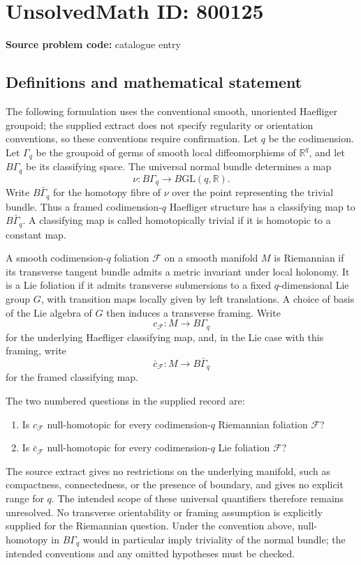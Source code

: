 \documentclass[11pt]{article}
\newcommand{\R}{\mathbb{R}}
\begin{document}
\section*{UnsolvedMath ID: 800125}
\textbf{Source problem code:} catalogue entry
\subsection{Definitions and mathematical statement}
The following formulation uses the conventional smooth, unoriented Haefliger groupoid; the supplied extract does not specify regularity or orientation conventions, so these conventions require confirmation. Let \(q\) be the codimension. Let \(\Gamma_q\) be the groupoid of germs of smooth local diffeomorphisms of \(\R^q\), and let \(B\Gamma_q\) be its classifying space. The universal normal bundle determines a map
\[
\nu\colon B\Gamma_q\longrightarrow B\mathrm{GL}(q,\R).
\]
Write \(B\bar\Gamma_q\) for the homotopy fibre of \(\nu\) over the point representing the trivial bundle. Thus a framed codimension-\(q\) Haefliger structure has a classifying map to \(B\bar\Gamma_q\). A classifying map is called homotopically trivial if it is homotopic to a constant map.

A smooth codimension-\(q\) foliation \(\mathcal F\) on a smooth manifold \(M\) is Riemannian if its transverse tangent bundle admits a metric invariant under local holonomy. It is a Lie foliation if it admits transverse submersions to a fixed \(q\)-dimensional Lie group \(G\), with transition maps locally given by left translations. A choice of basis of the Lie algebra of \(G\) then induces a transverse framing. Write
\[
c_{\mathcal F}\colon M\longrightarrow B\Gamma_q
\]
for the underlying Haefliger classifying map, and, in the Lie case with this framing, write
\[
\bar c_{\mathcal F}\colon M\longrightarrow B\bar\Gamma_q
\]
for the framed classifying map.

The two numbered questions in the supplied record are:
\begin{enumerate}
\item Is \(c_{\mathcal F}\) null-homotopic for every codimension-\(q\) Riemannian foliation \(\mathcal F\)?
\item Is \(\bar c_{\mathcal F}\) null-homotopic for every codimension-\(q\) Lie foliation \(\mathcal F\)?
\end{enumerate}
The source extract gives no restrictions on the underlying manifold, such as compactness, connectedness, or the presence of boundary, and gives no explicit range for \(q\). The intended scope of these universal quantifiers therefore remains unresolved. No transverse orientability or framing assumption is explicitly supplied for the Riemannian question. Under the convention above, null-homotopy in \(B\Gamma_q\) would in particular imply triviality of the normal bundle; the intended conventions and any omitted hypotheses must be checked.
\end{document}
